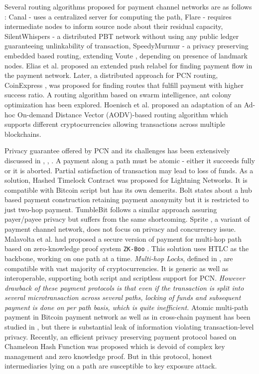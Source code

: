 \documentclass[10pt]{article}
\begin{document}
Several routing algorithms proposed for payment channel networks are as follows : Canal \cite{viswanath2012canal} - uses a centralized server for computing the path, Flare \cite{prihodko2016flare} - requires intermediate nodes to inform source node about their residual capacity, SilentWhispers \cite{silentwhispers} - a distributed PBT network without using any public ledger guaranteeing unlinkability of transaction, SpeedyMurmur \cite{speedymurmur} - a privacy preserving embedded based routing, extending Voute \cite{roos2016voute}, depending on presence of landmark nodes. Elias et al. \cite{elias} proposed an extended push relabel for finding payment flow in the payment network. Later, a distributed approach for PCN routing, CoinExpress \cite{yu2018coinexpress}, was proposed for finding routes that fulfill payment with higher success ratio. A routing algorithm based on swarm intelligence, ant colony optimization \cite{grunspan2018ant} has been explored. Hoenisch et al. \cite{hoenisch2018aodv} proposed an adaptation of an Ad-hoc On-demand Distance Vector (AODV)-based routing algorithm which supports different cryptocurrencies allowing transactions across multiple blockchains. 

Privacy guarantee offered by PCN and its challenges has been extensively discussed in  \cite{atlasinevitability}, \cite{herrera2016privacy}, \cite{gudgeon2019sok}. A payment along a path must be atomic - either it succeeds fully or it is aborted. Partial satisfaction of transaction may lead to loss of funds. As a solution, Hashed Timelock Contract \cite{poon2016bitcoin} was proposed for Lightning Networks. It is compatible with Bitcoin script but has its own demerits. Bolt \cite{green2017bolt} states about a hub based payment construction retaining payment anonymity but it is restricted to just two-hop payment. TumbleBit \cite{heilman2017tumblebit} follows a similar approach assuring payer/payee privacy but suffers from the same shortcoming. Sprite \cite{miller2017sprites}, a variant of payment channel network, does not focus on privacy and concurrency issue. Malavolta et al. \cite{malavolta} had proposed a secure version of payment for multi-hop path based on zero-knowledge proof system \texttt{ZK-Boo} \cite{giacomelli2016zkboo}. This solution uses HTLC as the backbone, working on one path at a time. \textit{Multi-hop Locks}, defined in \cite{malavoltamulti}, are compatible with vast majority of cryptocurrencies. It is generic as well as interoperable, supporting both script and scriptless support for PCN. \emph{However drawback of these payment protocols is that even if the transaction is split into several microtransaction across several paths, locking of funds and subsequent payment is done on per path basis, which is quite inefficient.} Atomic multi-path payment in Bitcoin payment network as well as in cross-chain payment  has been studied in \cite{eggeratomic}, \cite{herlihy2018atomic} but there is substantial leak of information violating transaction-level privacy. Recently, an efficient privacy preserving payment protocol based on Chameleon Hash Function \cite{yu2019chameleon} was proposed which is devoid of complex key management and zero knowledge proof. But in this protocol, honest intermediaries lying on a path are susceptible to key exposure attack.
\end{document}
